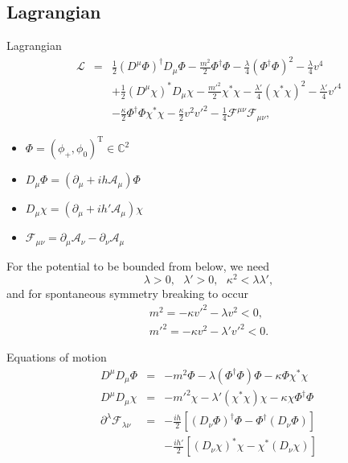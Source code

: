 \documentclass[14pt]{beamer}
\begin{document}
\subsection{Lagrangian}
\begin{frame}{Lagrangian}
\begin{eqnarray*} 
\mathcal{L} & = & \frac{1}{2}(D^{\mu}\Phi)^{\dagger}D_{\mu}\Phi - \frac{m^2}{2}\Phi^{\dagger}\Phi - \frac{\lambda}{4}(\Phi^{\dagger}\Phi)^2 -\frac{\lambda}{4}v^4   \nonumber\\
 & & +\frac{1}{2}(D^{\mu} \chi)^*D_{\mu} \chi - \frac{m'^2}{2}\chi^*\chi - \frac{\lambda'}{4}(\chi^* \chi)^2 -\frac{\lambda'}{4}v'^4\nonumber \\ 
 & & -\frac{\kappa}{2}\Phi^\dagger\Phi\chi^*\chi  -\frac{\kappa}{2}v^2v'^2 -\frac{1}{4}\mathcal{F}^{\mu\nu}\mathcal{F}_{\mu\nu}, %
\end{eqnarray*}

\begin{itemize}
	\item $\Phi = (\phi_+,\phi_0)^{\text{T}} \in \mathbb{C}^2$
	\item $D_{\mu} \Phi = (\partial_{\mu} + ih\mathcal{A}_{\mu})\Phi$
	\item $D_{\mu} \chi = (\partial_{\mu} + ih'\mathcal{A}_{\mu})\chi$
	\item $\mathcal{F}_{\mu\nu}= \partial_{\mu}\mathcal{A}_{\nu}-\partial_{\nu}\mathcal{A}_{\mu}$
\end{itemize}
\end{frame}

\begin{frame}
For the potential to be bounded from below, we need
\begin{equation*}
	\lambda>0, \ \ \ \lambda'>0, \ \ \ \kappa^2 < \lambda \lambda',
\end{equation*}
and for spontaneous symmetry breaking to occur
\begin{eqnarray*}
 m^2 = -\kappa v'^2 - \lambda v^2<0,\\
  m'^2 = -\kappa v^2 - \lambda' v'^2<0.
\end{eqnarray*}

\end{frame}

\begin{frame}{Equations of motion}
\begin{eqnarray*}
	D^{\mu}D_{\mu} \Phi & = & -m^2 \Phi - \lambda (\Phi^{\dagger}\Phi)\Phi - \kappa \Phi \chi^* \chi \\
	D^{\mu}D_{\mu} \chi & = & -m'^2 \chi - \lambda' (\chi^{*}\chi)\chi - \kappa \chi \Phi^{\dagger} \Phi \\
	\partial^{\lambda}\mathcal{F}_{\lambda\nu}  & = & -\frac{ih}{2}\left[ (D_{\nu}\Phi)^{\dagger}\Phi-\Phi^{\dagger}(D_{\nu}\Phi)\right] \\
	& & - \frac{ih'}{2}\left[ (D_{\nu}\chi)^{*}\chi-\chi^{*}(D_{\nu}\chi)\right]
\end{eqnarray*}
\end{frame}
\end{document}
